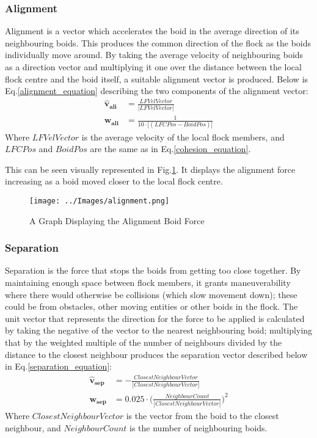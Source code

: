 \subsubsection{Alignment}
Alignment is a vector which accelerates the boid in the average direction of its neighbouring boids. This produces the common direction of the flock as the boids individually move around. By taking the average velocity of neighbouring boids as a direction vector and multiplying it one over the distance between the local flock centre and the boid itself, a suitable alignment vector is produced. Below is Eq.\ref{alignment_equation} describing the two components of the alignment vector:
\begin{equation}
\begin{split}
	\boldsymbol{\hat{v}_{ali}} &= \frac{ LFVelVector} {|LFVelVector|} \\
	\boldsymbol{w_{ali}} &= \frac{1} {10 \cdot |(LFCPos - BoidPos)|}
\end{split}
\label{alignment_equation}
\end{equation}
Where $LFVelVector$ is the average velocity of the local flock members, and $LFCPos$ and $BoidPos$ are the same as in Eq.\ref{cohesion_equation}.

This can be seen visually represented in Fig.\ref{fig:alignment}. It displays the alignment force increasing as a boid moved closer to the local flock centre.
\begin{figure}[H]
	\texttt{[image: ../Images/alignment.png]}
	\caption{A Graph Displaying the Alignment Boid Force}
	\label{fig:alignment}
\end{figure}

\subsubsection{Separation}
Separation is the force that stops the boids from getting too close together. By maintaining enough space between flock members, it grants maneuverability where there would otherwise be collisions (which slow movement down); these could be from obstacles, other moving entities or other boids in the flock. The unit vector that represents the direction for the force to be applied is calculated by taking the negative of the vector to the nearest neighbouring boid; multiplying that by the weighted multiple of the number of neighbours divided by the distance to the closest neighbour produces the separation vector described below in Eq.\ref{separation_equation}:
\begin{equation}
\begin{split}
	\boldsymbol{\hat{v}_{sep}} &= -\frac{ClosestNeighbourVector} {| ClosestNeighbourVector|} \\
	\boldsymbol{w_{sep}} &= 0.025 \cdot  \Big(\frac{NeighbourCount} {|ClosestNeighbourVector|}\Big)^2
\end{split}
\label{separation_equation}
\end{equation}
Where $ClosestNeighbourVector$ is the vector from the boid to the closest neighbour, and $NeighbourCount$ is the number of neighbouring boids.

